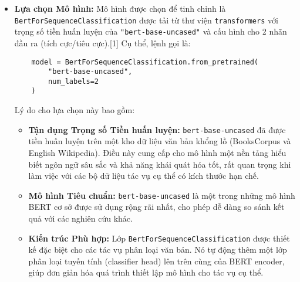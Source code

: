 \begin{itemize}
    \item \textbf{Lựa chọn Mô hình:}
    Mô hình được chọn để tinh chỉnh là \texttt{BertForSequenceClassification} được tải từ thư viện \texttt{transformers} với trọng số tiền huấn luyện của \texttt{"bert-base-uncased"} và cấu hình cho 2 nhãn đầu ra (tích cực/tiêu cực).[1] Cụ thể, lệnh gọi là:
    \begin{verbatim}
    model = BertForSequenceClassification.from_pretrained(
        "bert-base-uncased", 
        num_labels=2
    )
    \end{verbatim}
    Lý do cho lựa chọn này bao gồm:
    \begin{itemize}
        \item \textbf{Tận dụng Trọng số Tiền huấn luyện:} \texttt{bert-base-uncased} đã được tiền huấn luyện trên một kho dữ liệu văn bản khổng lồ (BooksCorpus và English Wikipedia). Điều này cung cấp cho mô hình một nền tảng hiểu biết ngôn ngữ sâu sắc và khả năng khái quát hóa tốt, rất quan trọng khi làm việc với các bộ dữ liệu tác vụ cụ thể có kích thước hạn chế.
        \item \textbf{Mô hình Tiêu chuẩn:} \texttt{bert-base-uncased} là một trong những mô hình BERT cơ sở được sử dụng rộng rãi nhất, cho phép dễ dàng so sánh kết quả với các nghiên cứu khác.
        \item \textbf{Kiến trúc Phù hợp:} Lớp \texttt{BertForSequenceClassification} được thiết kế đặc biệt cho các tác vụ phân loại văn bản. Nó tự động thêm một lớp phân loại tuyến tính (classifier head) lên trên cùng của BERT encoder, giúp đơn giản hóa quá trình thiết lập mô hình cho tác vụ cụ thể.
    \end{itemize}


\end{itemize}
